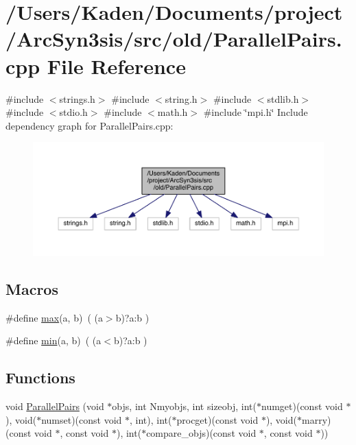 \hypertarget{a00593}{}\section{/\+Users/\+Kaden/\+Documents/project/\+Arc\+Syn3sis/src/old/\+Parallel\+Pairs.cpp File Reference}
\label{a00593}
{\ttfamily \#include $<$strings.\+h$>$}\newline
{\ttfamily \#include $<$string.\+h$>$}\newline
{\ttfamily \#include $<$stdlib.\+h$>$}\newline
{\ttfamily \#include $<$stdio.\+h$>$}\newline
{\ttfamily \#include $<$math.\+h$>$}\newline
{\ttfamily \#include \char`\"{}mpi.\+h\char`\"{}}\newline
Include dependency graph for Parallel\+Pairs.\+cpp\+:\nopagebreak
\begin{figure}[H]
\begin{center}
\leavevmode
\includegraphics[width=350pt]{a00594}
\end{center}
\end{figure}
\subsection*{Macros}
\begin{DoxyCompactItemize}
\item 
\#define \hyperlink{a00593_affe776513b24d84b39af8ab0930fef7f}{max}(a,  b)~( (a$>$b)?a\+:b )
\item 
\#define \hyperlink{a00593_ac6afabdc09a49a433ee19d8a9486056d}{min}(a,  b)~( (a$<$b)?a\+:b )
\end{DoxyCompactItemize}
\subsection*{Functions}
\begin{DoxyCompactItemize}
\item 
void \hyperlink{a00593_a20e0973b5bd186b5b6a4be06801451b6}{Parallel\+Pairs} (void $\ast$objs, int Nmyobjs, int sizeobj, int($\ast$numget)(const void $\ast$), void($\ast$numset)(const void $\ast$, int), int($\ast$procget)(const void $\ast$), void($\ast$marry)(const void $\ast$, const void $\ast$), int($\ast$compare\+\_\+objs)(const void $\ast$, const void $\ast$))
\end{DoxyCompactItemize}


